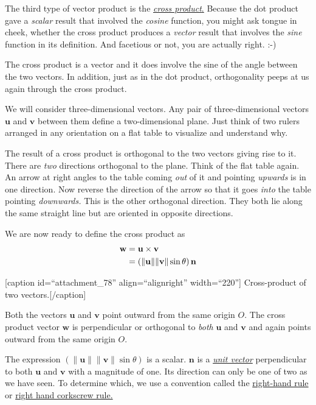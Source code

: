 \documentclass[
  a4paper,
]{article}
\begin{document}
The third type of vector product is the
\href{http://mathworld.wolfram.com/CrossProduct.html}{\emph{cross
product}.} Because the dot product gave a \emph{scalar} result that
involved the \emph{cosine} function, you might ask tongue in cheek,
whether the cross product produces a \emph{vector} result that involves
the \emph{sine} function in its definition. And facetious or not, you
are actually right. :-)

The cross product is a vector and it does involve the sine of the angle
between the two vectors. In addition, just as in the dot product,
orthogonality peeps at us again through the cross product.

We will consider three-dimensional vectors. Any pair of
three-dimensional vectors \(\mathbf{u}\) and \(\mathbf{v}\) between them
define a two-dimensional plane. Just think of two rulers arranged in any
orientation on a flat table to visualize and understand why.

The result of a cross product is orthogonal to the two vectors giving
rise to it. There are \emph{two} directions orthogonal to the plane.
Think of the flat table again. An arrow at right angles to the table
coming \emph{out} of it and pointing \emph{upwards} is in one direction.
Now reverse the direction of the arrow so that it goes \emph{into} the
table pointing \emph{downwards.} This is the other orthogonal direction.
They both lie along the same straight line but are oriented in opposite
directions.

We are now ready to define the cross product as \[
\begin{aligned}
\mathbf{w} &= \mathbf{u} \times \mathbf{v}\\
&= (\lVert\mathbf{u}\rVert \lVert\mathbf{v}\rVert \sin \theta) \thinspace \mathbf{n}
\end{aligned}
\]

{[}caption id=``attachment\_78'' align=``alignright'' width=``220''{]}
Cross-product of two vectors.{[}/caption{]}

Both the vectors \(\mathbf{u}\) and \(\mathbf{v}\) point outward from
the same origin \(O\). The cross product vector \(\mathbf{w}\) is
perpendicular or orthogonal to \emph{both} \(\mathbf{u}\) and
\(\mathbf{v}\) and again points outward from the same origin \(O\).

The expression
\((\lVert\mathbf{u}\rVert \lVert\mathbf{v}\rVert \sin \theta)\) is a
scalar. \(\mathbf{n}\) is a
\href{http://mathworld.wolfram.com/UnitVector.html}{\emph{unit vector}}
perpendicular to both \(\mathbf{u}\) and \(\mathbf{v}\) with a magnitude
of one. Its direction can only be one of two as we have seen. To
determine which, we use a convention called the
\href{http://mathworld.wolfram.com/Right-HandRule.html}{right-hand rule}
or \href{http://en.wikipedia.org/wiki/Right-hand_rule}{right hand
corkscrew rule.}
\end{document}
